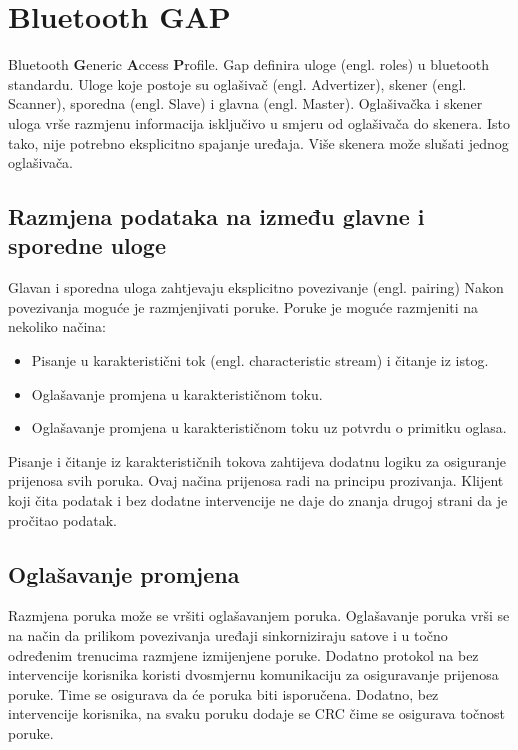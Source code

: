 \documentclass[times, utf8, diplomski]{diplomski}
\begin{document}
\section{Bluetooth GAP}
Bluetooth \textbf{G}eneric \textbf{A}ccess \textbf{P}rofile.
Gap definira uloge (engl. roles) u bluetooth standardu. Uloge koje postoje su oglašivač (engl. Advertizer), skener (engl. Scanner), sporedna (engl. Slave) i glavna (engl. Master). Oglašivačka i skener uloga vrše razmjenu informacija isključivo u smjeru od oglašivača do skenera. Isto tako, nije potrebno eksplicitno spajanje uređaja.
Više skenera može slušati jednog oglašivača.

\subsection {Razmjena podataka na između glavne i sporedne uloge}
Glavan i sporedna uloga zahtjevaju eksplicitno povezivanje (engl. pairing) Nakon povezivanja moguće je razmjenjivati poruke. Poruke je moguće razmjeniti na nekoliko načina:

\begin{itemize}
  \item Pisanje u karakteristični tok (engl. characteristic stream) i čitanje iz istog.
  \item Oglašavanje promjena u karakterističnom toku.
  \item Oglašavanje promjena u karakterističnom toku uz potvrdu o primitku oglasa.
\end{itemize}

Pisanje i čitanje iz karakterističnih tokova zahtijeva dodatnu logiku za osiguranje prijenosa svih poruka. Ovaj načina prijenosa radi na principu prozivanja. Klijent koji čita podatak i bez dodatne intervencije ne daje do znanja drugoj strani da je pročitao podatak.

\subsection {Oglašavanje promjena}
Razmjena poruka može se vršiti oglašavanjem poruka. Oglašavanje poruka vrši se na način da prilikom povezivanja uređaji sinkorniziraju satove i u točno određenim trenucima razmjene izmijenjene poruke. Dodatno protokol na bez intervencije korisnika koristi dvosmjernu komunikaciju za osiguravanje prijenosa poruke. Time se osigurava da će poruka biti isporučena. Dodatno, bez intervencije korisnika, na svaku poruku dodaje se CRC čime se osigurava točnost poruke.
\end{document}

